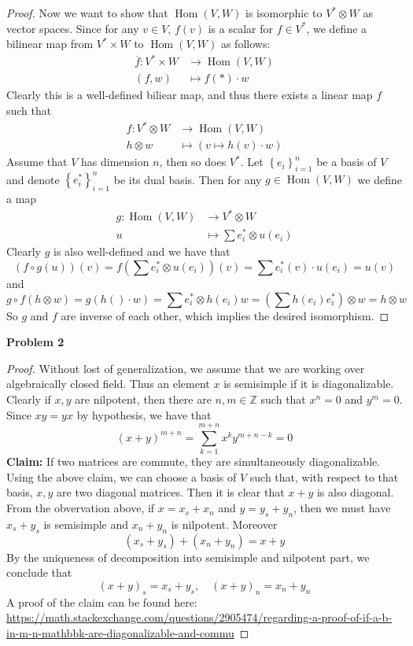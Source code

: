 \documentclass[12pt]{article} %
\DeclareMathOperator{\Hom}{Hom}
\begin{document}
\begin{proof}
    Now we want to show that $\Hom(V,W)$ is isomorphic to $V^*\otimes W$ as vector spaces. Since for any
    $v \in V$, $f(v)$ is a scalar for $f \in V^*$, we define a bilinear map from $V^* \times W$ to $\Hom(V,W)$ as follows:
    \begin{align*}
        \overline{f} \colon V^* \times W & \to \Hom(V,W)       \\
        (f,w)                            & \mapsto f(*)\cdot w
    \end{align*}
    Clearly this is a well-defined biliear map, and thus there exists a linear map $f$ such that
    \begin{align*}
        f \colon V^* \otimes W & \to \Hom(V,W)                  \\
        h\otimes w             & \mapsto (v\mapsto h(v)\cdot w)
    \end{align*}
    Assume that $V$ has dimension $n$, then so does $V^*$. Let $\left\lbrace e_i\right\rbrace_{i=1}^n$ be a basis of $V$ and
    denote $\left\lbrace e^*_i\right\rbrace_{i=1}^n$ be its dual basis. Then for any $g \in \Hom(V,W)$ we define a map
    \begin{align*}
        g \colon  \Hom(V,W) & \to V^* \otimes W                 \\
        u                   & \mapsto \sum e_i^* \otimes u(e_i)
    \end{align*}
    Clearly $g$ is also well-defined and we have that
    \[(f\circ g(u))(v) = f\left(\sum e_i^* \otimes u(e_i)\right)(v) = \sum e_i^*(v)\cdot u(e_i)=u(v)\]
    and
    \[g\circ f (h\otimes w)=g(h()\cdot w)=\sum e_i^* \otimes h(e_i)w = (\sum h(e_i)e_i^*)\otimes w=h\otimes w \]
    So $g$ and $f$ are inverse of each other, which implies the desired isomorphism.
\end{proof}
\textbf{Problem 2}
\begin{proof}
    Without lost of generalization, we assume that we are working over algebraically closed field.
    Thus an element $x$ is semisimple if it is diagonalizable. Clearly if $x,y$ are nilpotent, then there are $n,m \in \mathbb{Z}$ such that
    $x^n=0$ and $y^m=0$. Since $xy=yx$ by hypothesis, we have that
    \[(x+y)^{m+n} = \sum_{k=1}^{m+n} x^k y^{m+n-k} = 0\]
    \textbf{Claim:} If two matrices are commute, they are simultaneously diagonalizable.
    Using the above claim, we can choose a basis of $V$ such that, with respect to that basis, $x,y$ are two diagonal matrices.
    Then it is clear that $x+y$ is also diagonal.
    From the obvervation above, if $x = x_s+x_n$ and $y=y_s+y_n$, then we must have
    $x_s+y_s$ is semisimple and $x_n+y_n$ is nilpotent. Moreover
    \[(x_s+y_s)+(x_n+y_n) = x+y\]
    By the uniqueness of decomposition into semisimple and nilpotent part, we conclude that
    \[(x+y)_s=x_s+y_s,\quad (x+y)_n = x_n+y_n\]
    A proof of the claim can be found here: \url{https://math.stackexchange.com/questions/2905474/regarding-a-proof-of-if-a-b-in-m-n-mathbbk-are-diagonalizable-and-commu}
\end{proof}
\end{document}
